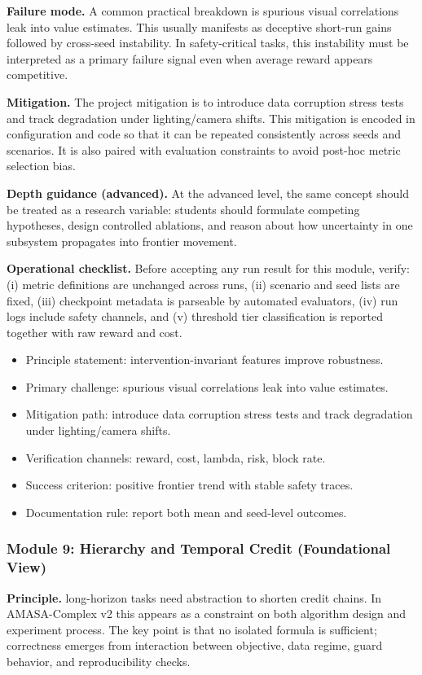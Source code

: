 \documentclass[conference]{IEEEtran}
\begin{document}
\textbf{Failure mode.} A common practical breakdown is spurious visual correlations leak into value estimates. This usually manifests as deceptive short-run gains followed by cross-seed instability. In safety-critical tasks, this instability must be interpreted as a primary failure signal even when average reward appears competitive.

\textbf{Mitigation.} The project mitigation is to introduce data corruption stress tests and track degradation under lighting/camera shifts. This mitigation is encoded in configuration and code so that it can be repeated consistently across seeds and scenarios. It is also paired with evaluation constraints to avoid post-hoc metric selection bias.

\textbf{Depth guidance (advanced).} At the advanced level, the same concept should be treated as a research variable: students should formulate competing hypotheses, design controlled ablations, and reason about how uncertainty in one subsystem propagates into frontier movement.

\textbf{Operational checklist.} Before accepting any run result for this module, verify: (i) metric definitions are unchanged across runs, (ii) scenario and seed lists are fixed, (iii) checkpoint metadata is parseable by automated evaluators, (iv) run logs include safety channels, and (v) threshold tier classification is reported together with raw reward and cost.

\begin{itemize}[leftmargin=*]
  \item Principle statement: intervention-invariant features improve robustness.
  \item Primary challenge: spurious visual correlations leak into value estimates.
  \item Mitigation path: introduce data corruption stress tests and track degradation under lighting/camera shifts.
  \item Verification channels: reward, cost, lambda, risk, block rate.
  \item Success criterion: positive frontier trend with stable safety traces.
  \item Documentation rule: report both mean and seed-level outcomes.
\end{itemize}


\subsubsection{Module 9: Hierarchy and Temporal Credit (Foundational View)}
\textbf{Principle.} long-horizon tasks need abstraction to shorten credit chains. In AMASA-Complex v2 this appears as a constraint on both algorithm design and experiment process. The key point is that no isolated formula is sufficient; correctness emerges from interaction between objective, data regime, guard behavior, and reproducibility checks.
\end{document}
